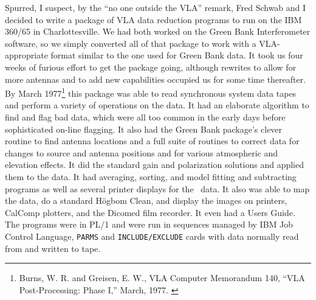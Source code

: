 Spurred, I suspect, by the ``no one outside the VLA'' remark, Fred
Schwab and I decided to write a package of VLA data reduction programs
to run on the IBM 360/65 in Charlottesville.  We had both worked on
the Green Bank Interferometer software, so we simply converted all of
that package to work with a VLA-appropriate format similar to the one
used for Green Bank data.  It took us four weeks of furious effort to
get the package going, although rewrites to allow for more antennas
and to add new capabilities occupied us for some time thereafter.  By
March 1977\footnote{Burns, W. R. and Greisen, E. W., VLA Computer
Memorandum 140, ``VLA Post-Processing: Phase I,'' March, 1977.
\label{fn:BG1977}} this package was able to read synchronous system
data tapes and perform a variety of operations on the data.  It had an
elaborate algorithm to find and flag bad data, which were all too
common in the early days before sophisticated on-line flagging.  It
also had the Green Bank package's clever routine to find antenna
locations and a full suite of routines to correct data for changes to
source and antenna positions and for various atmospheric and elevation
effects.  It did the standard gain and polarization solutions and
applied them to the data.  It had averaging, sorting, and model
fitting and subtracting programs as well as several printer displays
for the \uv\ data.  It also was able to map the data, do a standard
H\"ogbom Clean, and display the images on printers, CalComp plotters,
and the Dicomed film recorder.  It even had a Users Guide.  The
programs were in PL/1 and were run in sequences managed by IBM Job
Control Language, {\tt PARMS} and {\tt INCLUDE/EXCLUDE} cards with
data normally read from and written to tape.

